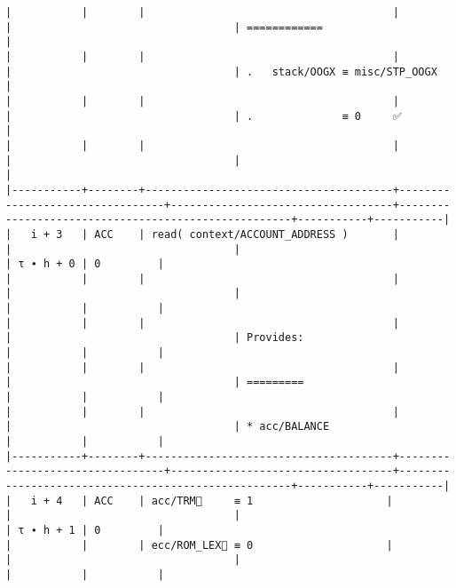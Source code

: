 \documentclass[varwidth=\maxdimen,margin=0.5cm,multi={verbatim}]{standalone}
\begin{document}
\begin{verbatim}
|           |        |                                       |                                 |                                   | ============                                        |
|           |        |                                       |                                 |                                   | .   stack/OOGX ≡ misc/STP_OOGX                      |
|           |        |                                       |                                 |                                   | .              ≡ 0     ✅                           |
|           |        |                                       |                                 |                                   |                                                     |
|-----------+--------+---------------------------------------+---------------------------------+-----------------------------------+-----------------------------------------------------+-----------+-----------|
|   i + 3   | ACC    | read( context/ACCOUNT_ADDRESS )       |                                 |                                   |                                                     | τ ∙ h + 0 | 0         |
|           |        |                                       |                                 |                                   |                                                     |           |           |
|           |        |                                       |                                 |                                   | Provides:                                           |           |           |
|           |        |                                       |                                 |                                   | =========                                           |           |           |
|           |        |                                       |                                 |                                   | * acc/BALANCE                                       |           |           |
|-----------+--------+---------------------------------------+---------------------------------+-----------------------------------+-----------------------------------------------------+-----------+-----------|
|   i + 4   | ACC    | acc/TRM🚩     ≡ 1                     |                                 |                                   |                                                     | τ ∙ h + 1 | 0         |
|           |        | ecc/ROM_LEX🚩 ≡ 0                     |                                 |                                   |                                                     |           |           |

\end{verbatim}
\end{document}
